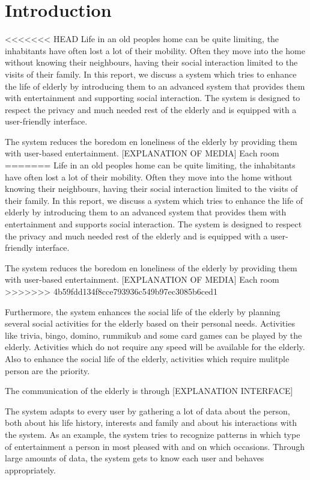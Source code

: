 \documentclass[12pt, a4paper]{article}
\begin{document}
\tableofcontents 
\newpage
\section{Introduction}
<<<<<<< HEAD
Life in an old peoples home can be quite limiting, the inhabitants have often lost a lot of their mobility. Often they move into the home without knowing their neighbours, having their social interaction limited to the visits of their family. In this report, we discuss a system which tries to enhance the life of elderly by introducing them to an advanced system that provides them with entertainment and supporting social interaction. The system is designed to respect the privacy and much needed rest of the elderly and is equipped with a user-friendly interface.

 The system reduces the boredom en loneliness of the elderly by providing them with user-based entertainment. [EXPLANATION OF MEDIA] Each room
=======
Life in an old peoples home can be quite limiting, the inhabitants have often lost a lot of their mobility. Often they move into the home without knowing their neighbours, having their social interaction limited to the visits of their family. In this report, we discuss a system which tries to enhance the life of elderly by introducing them to an advanced system that provides them with entertainment and supports social interaction. The system is designed to respect the privacy and much needed rest of the elderly and is equipped with a user-friendly interface.

The system reduces the boredom en loneliness of the elderly by providing them with user-based entertainment. [EXPLANATION OF MEDIA] Each room
>>>>>>> 4b59fdd134f8cce793936c549b97ec3085b6ced1

Furthermore, the system enhances the social life of the elderly by planning several social activities for the elderly based on their personal needs. Activities like trivia, bingo, domino, rummikub and some card games can be played by the elderly. Activities which do not require any speed will be available for the elderly. Also to enhance the social life of the elderly, activities which require mulitple person are the priority.

The communication of the elderly is through [EXPLANATION INTERFACE]

The system adapts to every user by gathering a lot of data about the person, both about his life history, interests and family and about his interactions with the system. As an example, the system tries to recognize patterns in which type of entertainment a person in most pleased with and on which occasions. Through large amounts of data, the system gets to know each user and behaves appropriately.
\end{document}
